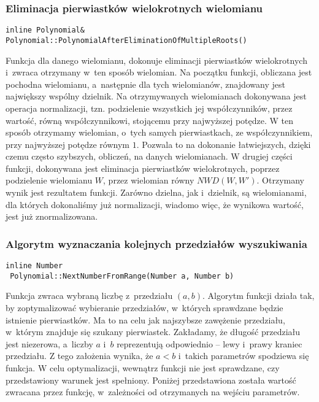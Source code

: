 \subsubsection{Eliminacja pierwiastków wielokrotnych wielomianu}
\begin{lstlisting}
inline Polynomial&
Polynomial::PolynomialAfterEliminationOfMultipleRoots()
\end{lstlisting}

Funkcja dla danego wielomianu, dokonuje eliminacji pierwiastków wielokrotnych i~zwraca otrzymany w~ten sposób wielomian. Na początku funkcji, obliczana jest pochodna wielomianu, a~następnie dla tych wielomianów, znajdowany jest największy wspólny dzielnik. Na otrzymywanych wielomianach dokonywana jest operacja normalizacji, tzn. podzielenie wszystkich jej współczynników, przez wartość, równą współczynnikowi, stojącemu przy najwyższej potędze. W ten sposób otrzymamy wielomian, o~tych samych pierwiastkach, ze współczynnikiem, przy najwyższej potędze równym $1$. Pozwala to na dokonanie łatwiejszych, dzięki czemu często szybszych, obliczeń, na danych wielomianach. W drugiej części funkcji, dokonywana jest eliminacja pierwiastków wielokrotnych, poprzez podzielenie wielomianu $W$, przez wielomian równy $NWD(W, W')$. Otrzymany wynik jest rezultatem funkcji. Zarówno dzielna, jak i~dzielnik, są wielomianami, dla których dokonaliśmy już normalizacji, wiadomo więc, że wynikowa wartość, jest już znormalizowana.

\subsubsection{Algorytm wyznaczania kolejnych przedziałów wyszukiwania}
\begin{lstlisting}
inline Number
 Polynomial::NextNumberFromRange(Number a, Number b)
\end{lstlisting}

Funkcja zwraca wybraną liczbę z~przedziału $(a,b)$. Algorytm funkcji działa tak, by zoptymalizować wybieranie przedziałów, w~których sprawdzane będzie istnienie pierwiastków. Ma to na celu jak najszybsze zawężenie przedziału, w~którym znajduje się szukany pierwiastek. Zakładamy, że długość przedziału jest niezerowa, a~liczby $a$ i~$b$ reprezentują odpowiednio -- lewy i~prawy kraniec przedziału. Z tego założenia wynika, że $a<b$ i~takich parametrów spodziewa się funkcja. W celu optymalizacji, wewnątrz funkcji nie jest sprawdzane, czy przedstawiony warunek jest spełniony. Poniżej przedstawiona została wartość zwracana przez funkcję, w~zależności od otrzymanych na wejściu parametrów.


